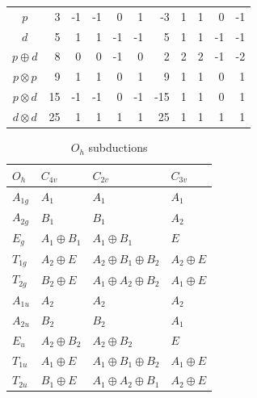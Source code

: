 \documentclass[twocolumn,showpacs,preprintnumbers,superscriptaddress,prb,floatfix,aps,10pt]{revtex4-1}
\begin{document}
\begin{table}
\begin{ruledtabular}
\begin{tabular*}{10cm}{llrrrrrrrrrr}
\multicolumn{2}{c}{$p$          } &  3  &     -1 &    -1  &     0  &     1  &  -3  &          1  &          1  &          0  &         -1  \\
\multicolumn{2}{c}{$d$          } &  5  &      1 &     1  &    -1  &    -1  &   5  &          1  &          1  &         -1  &         -1  \\
\multicolumn{2}{c}{$p \oplus  d$} &  8  &      0 &     0  &    -1  &     0  &   2  &          2  &          2  &         -1  &         -2  \\
\multicolumn{2}{c}{$p \otimes p$} &  9  &      1 &     1  &     0  &     1  &   9  &          1  &          1  &          0  &          1  \\
\multicolumn{2}{c}{$p \otimes d$} & 15  &     -1 &    -1  &     0  &    -1  & -15  &          1  &          1  &          0  &          1  \\
\multicolumn{2}{c}{$d \otimes d$} & 25  &      1 &     1  &     1  &     1  &  25  &          1  &          1  &          1  &          1  \\
\end{tabular*}
\end{ruledtabular}
\end{table}


\begin{table}
\caption{\label{table:subduction} $O_h$ subductions}
\begin{ruledtabular}
\begin{tabular*}{10cm}{llll}
$O_h$    & $C_{4v}$         & $C_{2v}$                              &   $C_{3v}$            \\ \hline
$A_{1g}$ & $A_1$            & $A_{1}$                               &   $A_1$               \\ 
$A_{2g}$ & $B_1$            & $B_{1}$                               &   $A_2$               \\ 
$E_g   $ & $A_1 \oplus B_1$ & $A_{1} \oplus B_{1}$                  &   $E$                 \\ 
$T_{1g}$ & $A_2 \oplus E$   & $A_{2} \oplus B_{1} \oplus B_{2}$     &   $A_2 \oplus E$      \\ 
$T_{2g}$ & $B_2 \oplus E$   & $A_{1} \oplus A_{2} \oplus B_{2}$     &   $A_1 \oplus E$      \\ 
$A_{1u}$ & $A_2$            & $A_{2}$                               &   $A_2$               \\ 
$A_{2u}$ & $B_2$            & $B_{2}$                               &   $A_1$               \\ 
$E_u   $ & $A_2 \oplus B_2$ & $A_{2} \oplus B_{2}$                  &   $E$                 \\ 
$T_{1u}$ & $A_1 \oplus E$   & $A_{1} \oplus B_{1} \oplus B_{2}$     &   $A_1 \oplus E$      \\ 
$T_{2u}$ & $B_1 \oplus E$   & $A_{1} \oplus A_{2} \oplus B_{1}$     &   $A_2 \oplus E$      \\ 
\end{tabular*}
\end{ruledtabular}
\end{table}
\end{document}
